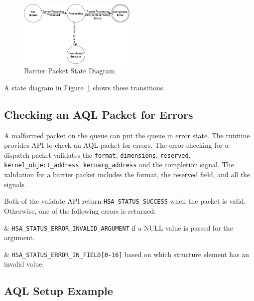 \begin{figure}
  \centering
  \includegraphics[width=0.5\textwidth] {barrierpacketstate}
  \centering
  \caption{Barrier Packet State Diagram}
  \label{fig:barrierpacketstate}
\end{figure}

A state diagram in Figure~\ref{fig:barrierpacketstate} shows these
transitions.

\hypertarget{aql_checking}{}\subsection{Checking an AQL Packet for
Errors} \label{aql_error}
A malformed packet on the queue can put the queue in error state.
The runtime provides API to check an AQL packet for errors. The
error checking for a dispatch packet validates the \texttt{format},
\texttt{dimensions}, \texttt{reserved},
\texttt{kernel\_object\_address}, \texttt{kernarg\_address} and the
completion signal. 
The validation for a barrier packet includes the format, the
reserved field, and all the signals. 



Both of the validate API return \texttt{HSA\_STATUS\_SUCCESS} when
the packet is valid. Otherwise, one of the following errors is
returned:

\begin{easylist}
& \texttt{HSA\_STATUS\_ERROR\_INVALID\_ARGUMENT} if a NULL value is
passed for the argument.

& \texttt{HSA\_STATUS\_ERROR\_IN\_FIELD[0-16]} based on which
structure element has an invalid value.
\end{easylist}


\hypertarget{aql_example}{}\subsection{AQL Setup
Example}\label{aql_example}


